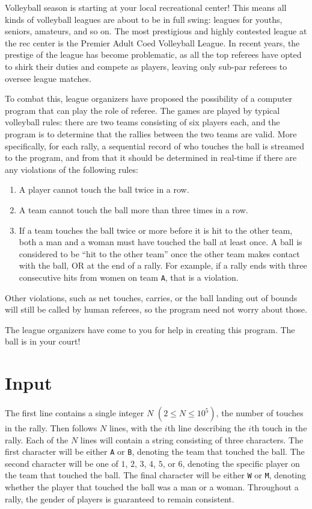 
Volleyball season is starting at your local recreational center! This means all kinds of volleyball
leagues are about to be in full swing: leagues for youths, seniors, amateurs, and so on. The most
prestigious and highly contested league at the rec center is the Premier Adult Coed Volleyball
League. In recent years, the prestige of the league has become problematic, as all the top referees
have opted to shirk their duties and compete as players, leaving only sub-par referees to oversee
league matches.

To combat this, league organizers have proposed the possibility of a computer program that can play the role 
of referee. The games are played by typical volleyball rules: there are two teams consisting of six players
each, and the program is to determine that the rallies between the two teams are valid. More specifically,
for each rally, a sequential record of who touches the ball is streamed to
the program, and from that it should be determined in real-time if there are any violations of the
following rules:

\begin{enumerate}
    \item A player cannot touch the ball twice in a row.
    \item A team cannot touch the ball more than three times in a row.
    \item If a team touches the ball twice or more before it is hit to the other team, both a man
    and a woman must have touched the ball at least once. A ball is considered to be ``hit to the other
    team'' once the other team makes contact with the ball, OR at the end of a rally. For example, if a
    rally ends with three consecutive hits from women on team \texttt{A}, that is a violation.
\end{enumerate}

Other violations, such as net touches, carries, or the ball landing out of bounds will still be called
by human referees, so the program need not worry about those.

The league organizers have come to you for help in creating this program. The ball is in your court!

\section*{Input}

The first line contains a single integer $N$ $(2 \leq N \leq 10^5)$, the number of touches in the rally. 
Then follows $N$ lines, with the $i$th line describing the $i$th touch in the rally. Each of the $N$ lines
will contain a string consisting of three characters. The first character will be either \texttt{A} or
\texttt{B}, denoting the team that touched the ball. The second character will be one of $1$,
$2$, $3$, $4$, $5$, or $6$, denoting the specific player on the team that
touched the ball. The final character will be either \texttt{W} or \texttt{M}, denoting whether the player
that touched the ball was a man or a woman. Throughout a rally, the gender of players is guaranteed to
remain consistent.

